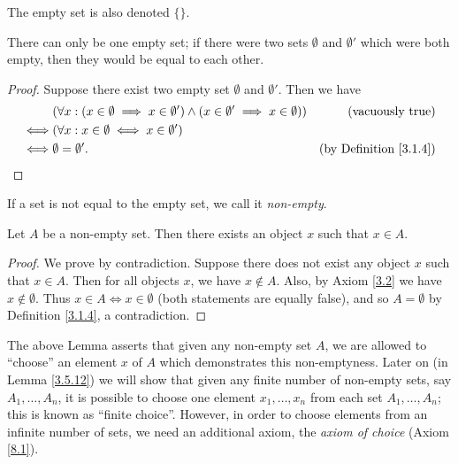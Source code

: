 \begin{note}
    The empty set is also denoted \(\{\}\).
\end{note}

\begin{additional corollary}\label{ac 3.1.2}
There can only be one empty set;
if there were two sets \(\emptyset\) and \(\emptyset'\) which were both empty, then they would be equal to each other.
\end{additional corollary}

\begin{proof}
    Suppose there exist two empty set \(\emptyset\) and \(\emptyset'\).
    Then we have
    \begin{align*}
             & (\forall x : (x \in \emptyset \implies x \in \emptyset') \land (x \in \emptyset' \implies x \in \emptyset)) & \text{(vacuously true)}            \\
        \iff & (\forall x : x \in \emptyset \iff x \in \emptyset')                                                                                              \\
        \iff & \emptyset = \emptyset'.                                                                                     & \text{(by Definition \ref{3.1.4})}
    \end{align*}
\end{proof}

\begin{note}
    If a set is not equal to the empty set, we call it \emph{non-empty}.
\end{note}

\setcounter{theorem}{5}
\begin{lemma}\label{3.1.6}
    Let \(A\) be a non-empty set.
    Then there exists an object \(x\) such that \(x \in A\).
\end{lemma}

\begin{proof}
    We prove by contradiction.
    Suppose there does not exist any object \(x\) such that \(x \in A\).
    Then for all objects \(x\), we have \(x \notin A\).
    Also, by Axiom \ref{3.2} we have \(x \notin \emptyset\).
    Thus \(x \in A \iff x \in \emptyset\) (both statements are equally false), and so \(A = \emptyset\) by Definition \ref{3.1.4}, a contradiction.
\end{proof}

\begin{remark}\label{3.1.7}
    The above Lemma asserts that given any non-empty set \(A\), we are allowed to ``choose'' an element \(x\) of \(A\) which demonstrates this non-emptyness.
    Later on (in Lemma \ref{3.5.12}) we will show that given any finite number of non-empty sets, say \(A_1, \dots, A_n\), it is possible to choose one element \(x_1, \dots, x_n\) from each set \(A_1, \dots, A_n\);
    this is known as ``finite choice''.
    However, in order to choose elements from an infinite number of sets, we need an additional axiom, the \emph{axiom of choice} (Axiom \ref{8.1}).
\end{remark}

